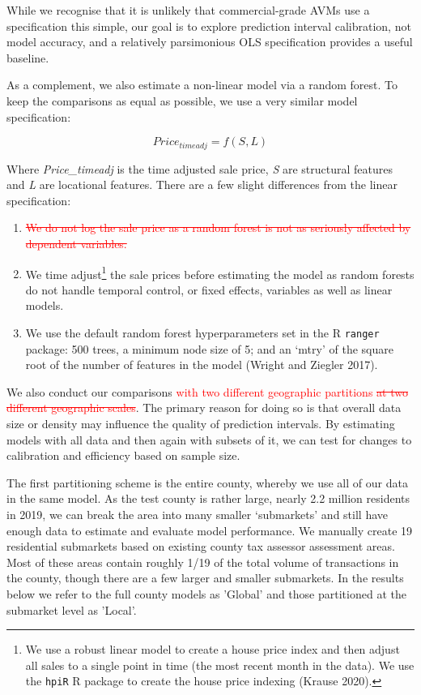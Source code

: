 \documentclass[colTwo]{anon}
\theoremstyle{definition}
\begin{document}
While we recognise that it is unlikely that commercial-grade AVMs use a specification this simple, our goal is to explore prediction interval calibration, not model accuracy, and a relatively parsimonious OLS specification provides a useful baseline.  

As a complement, we also estimate a non-linear model via a random forest.  To keep the comparisons as equal as possible, we use a very similar model specification:

\[Price_{timeadj} = f(S, L) \]

Where \textit{Price\_timeadj} is the time adjusted sale price, \textit{S} are structural features and \textit{L} are locational features. There are a few slight differences from the linear specification:

\begin{enumerate}
\item \textcolor{red}{ \st{We do not log the sale price as a random forest is not as seriously affected by dependent variables.}}
\item We time adjust\footnote{We use a robust linear model to create a house price index and then adjust all sales to a single point in time (the most recent month in the data).  We use the \texttt{hpiR} R package to create the house price indexing (Krause 2020).} the sale prices before estimating the model as random forests do not handle temporal control, or fixed effects, variables as well as linear models. 
\item We use the default random forest hyperparameters set in the R \texttt{ranger} package: 500 trees, a minimum node size of 5; and an ‘mtry’ of the square root of the number of features in the model (Wright and Ziegler 2017). 
\end{enumerate}

We also conduct our comparisons \textcolor{red}{with two different geographic partitions \st{at two different geographic scales}}.  The primary reason for doing so is that overall data size or density may influence the quality of prediction intervals.  By estimating models with all data and then again with subsets of it, we can test for changes to calibration and efficiency based on sample size.  

The first partitioning scheme is the entire county, whereby we use all of our data in the same model.  As the test county is rather large, nearly 2.2 million residents in 2019, we can break the area into many smaller ‘submarkets’ and still have enough data to estimate and evaluate model performance.  We manually create 19 residential submarkets based on existing county tax assessor assessment areas.  Most of these areas contain roughly 1/19 of the total volume of transactions in the county, though there are a few larger and smaller submarkets. In the results below we refer to the full county models as 'Global' and those partitioned at the submarket level as 'Local'. 
 
\end{document}
